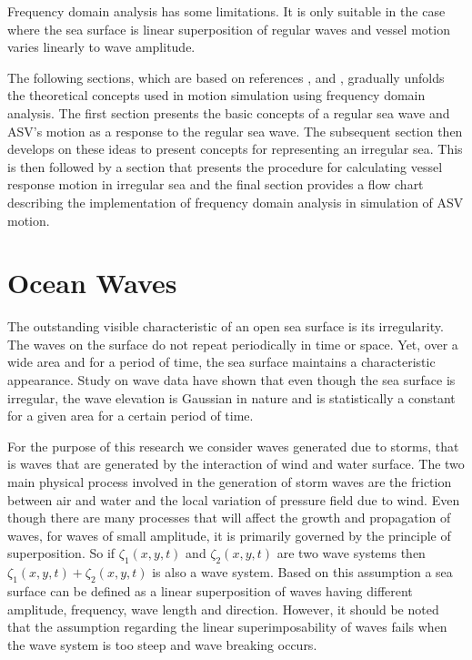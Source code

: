 Frequency domain analysis has some limitations. It is only suitable in the case
where the sea surface is linear superposition of regular waves and vessel motion
varies linearly to wave amplitude.  

The following sections, which are based on references
\cite{lewis1988principles},
\cite{hughes2010ship} and
\cite{bhattacharyya1978dynamics}, 
gradually unfolds the theoretical concepts used in motion simulation using
frequency domain analysis. The first section presents the basic concepts of a
regular sea wave and ASV's motion as a response to the regular sea wave. The
subsequent section then develops on these ideas to present concepts for
representing an irregular sea. This is then followed by a section that presents
the procedure for calculating vessel response motion in irregular sea and the
final section provides a flow chart describing the implementation of frequency
domain analysis in simulation of ASV motion.

\section{Ocean Waves} 

The outstanding visible characteristic of an open sea surface is its 
irregularity. The waves on the surface do not repeat periodically in time or 
space. Yet, over a wide area and for a period of time, the sea surface maintains
a characteristic appearance. Study on wave data have shown that even though the
sea surface is irregular, the wave elevation is Gaussian in nature and is 
statistically a constant for a given area for a certain period of time. 

For the purpose of this research we consider waves generated due to storms, that
is waves that are generated by the interaction of wind and water surface. The
two main physical process involved in the generation of storm waves are the
friction between air and water and the local variation of pressure field due to
wind. Even though there are many processes that will affect the growth and
propagation of waves, for waves of small amplitude, it is primarily governed by
the principle of superposition. So if $\zeta_1(x,y,t)$ and $\zeta_2(x,y,t)$ are
two wave systems then $\zeta_1(x,y,t) + \zeta_2(x,y,t)$ is also a wave system.
Based on this assumption a sea surface can be defined as a linear superposition
of waves having different amplitude, frequency, wave length and direction. 
However, it should be noted that the assumption regarding the linear 
superimposability of waves fails when the wave system is too steep and wave 
breaking occurs.

